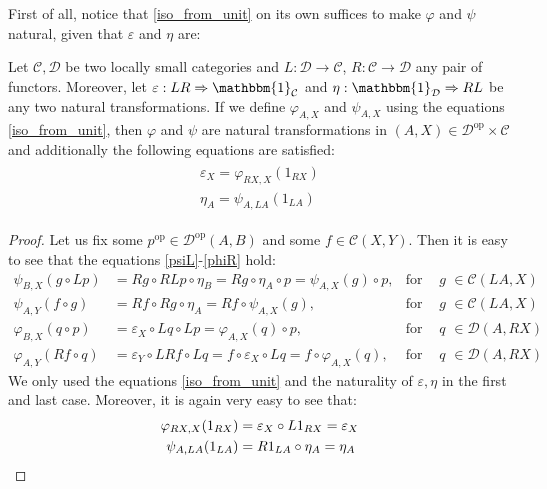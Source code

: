 First of all, notice that \eqref{iso_from_unit} on its own suffices to make $\varphi$ and $\psi$ natural, given that $\varepsilon$ and $\eta$ are:
\begin{proposition}\label{prop:nat_gives_nat} Let $\mathcal{C},\mathcal{D}$ be two locally small categories and $L:\mathcal{D}\to\mathcal{C}$, $R:\mathcal{C}\to\mathcal{D}$ any pair of functors. Moreover, let $\varepsilon:LR\Rightarrow\mathbbm{1}_{\mathcal{C}}$ and $\eta:\mathbbm{1}_{\mathcal{D}}\Rightarrow RL$ be any two natural transformations. If we define $\varphi_{A,X}$ and $\psi_{A,X}$ using the equations \eqref{iso_from_unit}, then $\varphi$ and $\psi$ are natural transformations in $(A,X)\in\mathcal{D}^{\mathrm{op}}\times\mathcal{C}$ and additionally the following equations are satisfied:
\begin{align}
\begin{split}
\varepsilon_X=\varphi_{RX,X}(1_{RX})\\[0.8em]
\eta_A=\psi_{A,LA}(1_{LA})
\end{split}\label{unit_from_iso}
\end{align}
\end{proposition}
\begin{proof} Let us fix some $p^{\mathrm{op}}\in\mathcal{D}^{\mathrm{op}}(A,B)$ and some $f\in\mathcal{C}(X,Y)$. Then it is easy to see that the equations \eqref{psiL}-\eqref{phiR} hold:
\begin{align*}
\psi_{B,X}(g\circ Lp)&=Rg\circ RLp\circ\eta_B=Rg\circ\eta_A\circ p=\psi_{A,X}(g)\circ p,&\text{for any } g&\in\mathcal{C}(LA,X)\\
\psi_{A,Y}(f\circ g)&=Rf\circ Rg\circ\eta_A=Rf\circ\psi_{A,X}(g),&\text{for any } g&\in\mathcal{C}(LA,X)\\
\varphi_{B,X}(q\circ p)&=\varepsilon_X\circ Lq\circ Lp=\varphi_{A,X}(q)\circ p,&\text{for any }q&\in\mathcal{D}(A,RX)\\
\varphi_{A,Y}(Rf\circ q)&=\varepsilon_Y\circ LRf\circ Lq=f\circ\varepsilon_X\circ Lq=f\circ\varphi_{A,X}(q),&\text{for any }q&\in\mathcal{D}(A,RX)
\end{align*}
We only used the equations \eqref{iso_from_unit} and the naturality of $\varepsilon,\eta$ in the first and last case. Moreover, it is again very easy to see that:
\begin{align*}
\varphi_{RX,X}(1_{RX})&=\varepsilon_X\circ L1_{RX}=\varepsilon_X\\
\psi_{A,LA}(1_{LA})&=R1_{LA}\circ\eta_A=\eta_A\qedhere
\end{align*}
\end{proof}

